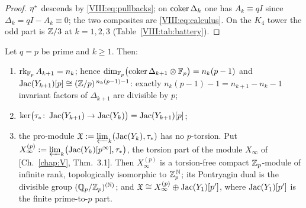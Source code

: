 \begin{proof}
$\eta^*$ descends by \eqref{VIII:eq:pullbacks}; on $\operatorname{coker}\Delta_k$ one has $A_k\equiv qI$
since $\Delta_k=qI-A_k\equiv0$; the two composites are \eqref{VIII:eq:calculus}. On the
$K_4$ tower the odd part is $\mathbb{Z}/3$ at $k=1,2,3$ (Table~\ref{VIII:tab:battery}).
\end{proof}

\begin{theorem}\label{VIII:thm:ptorsion}
Let $q=p$ be prime and $k\ge1$. Then:
\begin{enumerate}
\item[(i)] $\operatorname{rk}_{\mathbb{F}_p}A_{k+1}=n_k$; hence $\dim_{\mathbb{F}_p}\bigl(\operatorname{coker}\Delta_{k+1}\otimes\mathbb{F}_p\bigr)=n_k(p-1)$
and $\operatorname{Jac}(Y_{k+1})[p]\cong(\mathbb{Z}/p)^{\,n_k(p-1)-1}$: exactly $n_k(p-1)-1=n_{k+1}-n_k-1$
invariant factors of $\Delta_{k+1}$ are divisible by $p$;
\item[(ii)] $\ker\bigl(\tau_*\colon\operatorname{Jac}(Y_{k+1})\to\operatorname{Jac}(Y_k)\bigr)=\operatorname{Jac}(Y_{k+1})[p]$;
\item[(iii)] the pro-module $\mathfrak{X}:=\varprojlim_k(\operatorname{Jac}(Y_k),\tau_*)$ has no $p$-torsion. Put
$X_\infty^{(p)}:=\varprojlim_k\bigl(\operatorname{Jac}(Y_k)[p^\infty],\tau_*\bigr)$, the torsion part of
the module $X_\infty$ of {\rm[Ch.~\ref{chap:V}, Thm.~3.1]}. Then $X_\infty^{(p)}$ is a torsion-free
compact $\mathbb{Z}_p$-module of infinite rank, topologically isomorphic to $\mathbb{Z}_p^{\,\mathbb N}$;
its Pontryagin dual is the divisible group $(\mathbb{Q}_p/\mathbb{Z}_p)^{(\mathbb N)}$; and
$\mathfrak{X}\cong X_\infty^{(p)}\oplus\operatorname{Jac}(Y_1)[p']$, where $\operatorname{Jac}(Y_1)[p']$ is the finite
prime-to-$p$ part.
\end{enumerate}
\end{theorem}

